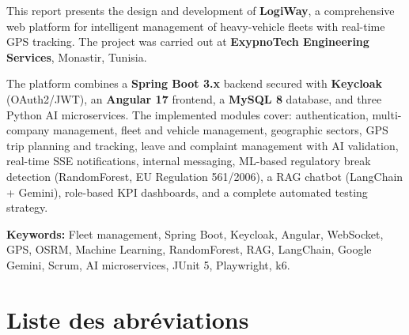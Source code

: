\documentclass[12pt,a4paper]{report}
\begin{document}
This report presents the design and development of \textbf{LogiWay}, a
comprehensive web platform for intelligent management of heavy-vehicle fleets
with real-time GPS tracking. The project was carried out at
\textbf{ExypnoTech Engineering Services}, Monastir, Tunisia.

The platform combines a \textbf{Spring Boot 3.x} backend secured with
\textbf{Keycloak} (OAuth2/JWT), an \textbf{Angular 17} frontend, a
\textbf{MySQL 8} database, and three Python AI microservices. The implemented
modules cover: authentication, multi-company management, fleet and vehicle
management, geographic sectors, GPS trip planning and tracking,
leave and complaint management with AI validation, real-time SSE notifications,
internal messaging, ML-based regulatory break detection (RandomForest, EU
Regulation 561/2006), a RAG chatbot (LangChain + Gemini), role-based KPI
dashboards, and a complete automated testing strategy.

\medskip
\textbf{Keywords:} Fleet management, Spring Boot, Keycloak, Angular,
WebSocket, GPS, OSRM, Machine Learning, RandomForest, RAG, LangChain,
Google Gemini, Scrum, AI microservices, JUnit 5, Playwright, k6.

\newpage

\chapter*{Liste des abréviations}
\end{document}
